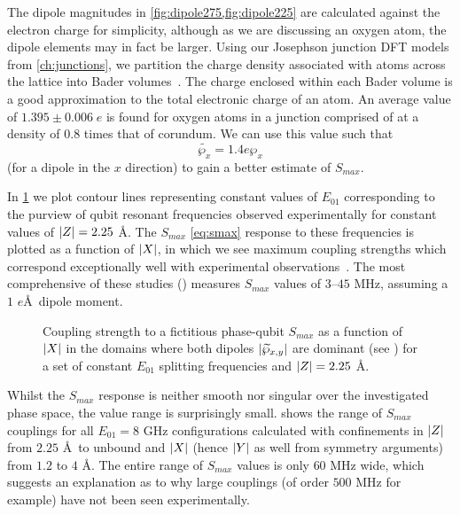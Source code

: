 The dipole magnitudes in \cref{fig:dipole275,fig:dipole225} are calculated against the electron charge for simplicity, although as we are discussing an oxygen atom, the dipole elements may in fact be larger.
Using our Josephson junction DFT models from \cref{ch:junctions}, we partition the charge density associated with atoms across the lattice into Bader volumes~\cite{Tang2009}.
The charge enclosed within each Bader volume is a good approximation to the total electronic charge of an atom.
An average value of $1.395\pm0.006 \; e$ is found for oxygen atoms in a junction comprised of  at a density of 0.8 times that of corundum. We can use this value such that
\begin{equation}
\widetilde{\wp_x} = 1.4e\wp_x
\end{equation}
(for a dipole in the $x$ direction) to gain a better estimate of $S_{max}$.

In \cref{fig:smax225} we plot contour lines representing constant values of $E_{01}$ corresponding to the purview of qubit resonant frequencies observed experimentally  for constant values of $\lvert Z\rvert = 2.25$ \AA.
The $S_{max}$ \cref{eq:smax} response to these frequencies is plotted as a function of $\lvert X\rvert$, in which we see maximum coupling strengths which correspond exceptionally well with experimental observations~\cite{Lupascu2009, Shalibo2010, Cole2010}.
The most comprehensive of these studies () measures $S_{max}$ values of $3$--$45$ MHz, assuming a $1$ $e$\AA\ dipole moment.

\begin{figure}[htp]
\resizebox{0.9\textwidth}{!}{}
\caption[$S_{max}$ Couplings]{\label{fig:smax225}Coupling strength to a fictitious phase-qubit $S_{max}$ as a function of $\lvert X\rvert$ in the domains where both dipoles $\lvert\widetilde{\wp}_{x,y}\rvert$ are dominant (see ) for a set of constant $E_{01}$ splitting frequencies and $\lvert Z\rvert = 2.25$ \AA.}
\end{figure}

Whilst the $S_{max}$ response is neither smooth nor singular over the investigated phase space, the value range is surprisingly small.
 shows the range of $S_{max}$ couplings for all $E_{01}=8$ GHz configurations calculated with confinements in $\lvert Z\rvert$ from $2.25$ \AA\ to unbound and $\lvert X\rvert$ (hence $\lvert Y\rvert$ as well from symmetry arguments) from $1.2$ to $4$ \AA.
The entire range of $S_{max}$ values is only $60$ MHz wide, which suggests an explanation as to why large couplings (of order $500$ MHz for example) have not been seen experimentally.

